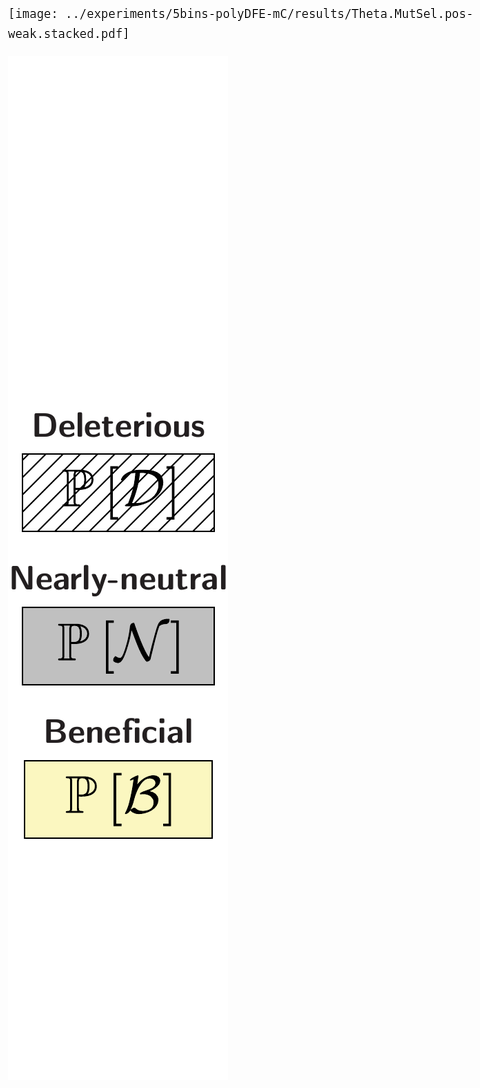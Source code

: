 \documentclass{article}
\begin{document}
\begin{center}
\begin{minipage}{0.09\linewidth}
        \end{minipage}
        \begin{minipage}{0.9\linewidth}
            \texttt{[image: ../experiments/5bins-polyDFE-mC/results/Theta.MutSel.pos-weak.stacked.pdf]} \\
        \end{minipage}
        \begin{minipage}{0.09\linewidth}
            \includegraphics[width=\linewidth, page=1]{artworks/legend.polycat}

\end{minipage}
\end{center}
\end{document}
